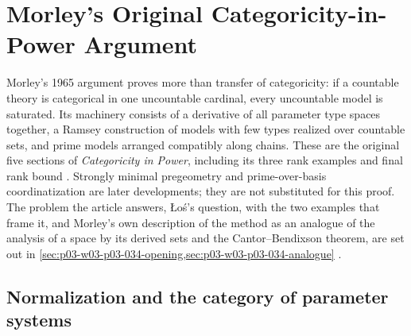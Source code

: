 \section{Morley's Original Categoricity-in-Power Argument}
\label{sec:p03-n-a-006-01}

Morley's 1965 argument proves more than transfer of categoricity: if a
countable theory is categorical in one uncountable cardinal, every
uncountable model is saturated. Its machinery consists of a derivative
of all parameter type spaces together, a Ramsey construction of models
with few types realized over countable sets, and prime models arranged
compatibly along chains. These are the original five sections of
\emph{Categoricity in Power}, including its three rank examples and
final rank bound \cite[pp.~514--538]{Morley1965}. Strongly minimal
pregeometry and prime-over-basis coordinatization are later developments;
they are not substituted for this proof. The problem the article answers,
Łoś's question, with the two examples that frame it, and Morley's own
description of the method as an analogue of the analysis of a space by its
derived sets and the Cantor--Bendixson theorem, are set out in
\cref{sec:p03-w03-p03-034-opening,sec:p03-w03-p03-034-analogue}
\cite[pp.~514--515]{Morley1965}.

\subsection{Normalization and the category of parameter systems}
\label{sec:p03-morley-normalization}

